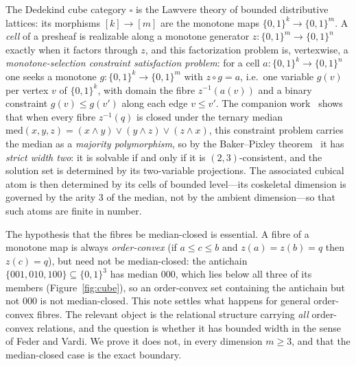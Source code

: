 \documentclass[11pt]{amsart}
\theoremstyle{plain}
\theoremstyle{definition}
\newcommand{\B}{\{0,1\}}
\newcommand{\med}{\mathrm{med}}
\begin{document}
The Dedekind cube category $\square$ is the Lawvere theory of bounded
distributive lattices: its morphisms $[k]\to[m]$ are the monotone maps
$\B^k\to\B^m$.  A \emph{cell} of a presheaf is realizable along a
monotone generator $z\colon\B^m\to\B^n$ exactly when it factors through
$z$, and this factorization problem is, vertexwise, a
\emph{monotone-selection constraint satisfaction problem}: for a cell
$a\colon\B^k\to\B^n$ one seeks a monotone $g\colon\B^k\to\B^m$ with
$z\circ g=a$, i.e.\ one variable $g(v)$ per vertex $v$ of $\B^k$, with
domain the fibre $z^{-1}(a(v))$ and a binary constraint $g(v)\le g(v')$
along each edge $v\le v'$.  The companion work~\cite{PaperW} shows that
when every fibre $z^{-1}(q)$ is closed under the ternary median
$\med(x,y,z)=(x\wedge y)\vee(y\wedge z)\vee(z\wedge x)$, this constraint
problem carries the median as a \emph{majority polymorphism}, so by the
Baker--Pixley theorem~\cite{BakerPixley} it has \emph{strict width
two}: it is solvable if and only if it is $(2,3)$-consistent, and the
solution set is determined by its two-variable projections.  The
associated cubical atom is then determined by its cells of bounded
level---its coskeletal dimension is governed by the arity $3$ of the
median, not by the ambient dimension---so that such atoms are finite in
number.

The hypothesis that the fibres be median-closed is essential.  A fibre
of a monotone map is always \emph{order-convex} (if $a\le c\le b$ and
$z(a)=z(b)=q$ then $z(c)=q$), but need not be median-closed: the
antichain $\{001,010,100\}\subseteq\B^3$ has median $000$, which lies
below all three of its members (Figure~\ref{fig:cube}), so an
order-convex set containing the antichain but not $000$ is not
median-closed.  This note settles what happens for general order-convex
fibres.  The relevant object is the relational structure carrying
\emph{all} order-convex relations, and the question is whether it has
bounded width in the sense of Feder and Vardi.  We prove it does not, in
every dimension $m\ge 3$, and that the median-closed case is the exact
boundary.
\end{document}
